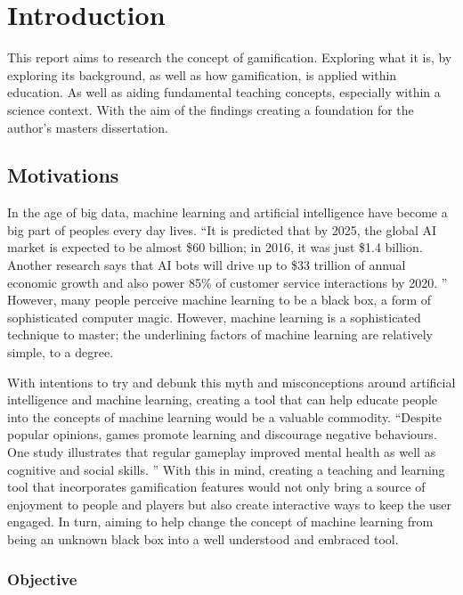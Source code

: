 \chapter{Introduction}
	\label{chap:intro}
	
	This report aims to research the concept of gamification. Exploring what it is, by exploring its background, as well as how gamification, is applied within education. As well as aiding fundamental teaching concepts, especially within a science context. With the aim of the findings creating a foundation for the author's masters dissertation. 
	
	\section{Motivations}
		\label{sec:intro_motivation} 
		
		In the age of big data, machine learning and artificial intelligence have become a big part of peoples every day lives. “It is predicted that by 2025, the global AI market is expected to be almost \$60 billion; in 2016, it was just \$1.4 billion. Another research says that AI bots will drive up to \$33 trillion of annual economic growth and also power 85\% of customer service interactions by 2020. \cite{hackernoon}” However, many people perceive machine learning to be a black box, a form of sophisticated computer magic. However, machine learning is a sophisticated technique to master; the underlining factors of machine learning are relatively simple, to a degree.
		
		With intentions to try and debunk this myth and misconceptions around artificial intelligence and machine learning, creating a tool that can help educate people into the concepts of machine learning would be a valuable commodity. “Despite popular opinions, games promote learning and discourage negative behaviours. One study illustrates that regular gameplay improved mental health as well as cognitive and social skills. \cite{classcraft}” With this in mind, creating a teaching and learning tool that incorporates gamification features would not only bring a source of enjoyment to people and players but also create interactive ways to keep the user engaged. In turn, aiming to help change the concept of machine learning from being an unknown black box into a well understood and embraced tool.
	
	\subsection{Objective}
		\label{sec:intro_objective} 
		
